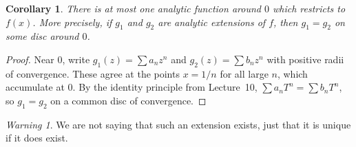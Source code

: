 \documentclass[11pt]{article}
\theoremstyle{plain}
\newtheorem{corollary}[theorem]{Corollary}
\theoremstyle{definition}
\theoremstyle{remark}
\newtheorem*{warning}{Warning}
\numberwithin{equation}{section}
\begin{document}
\begin{corollary}
\label{cor:unique-ext}
There is at most one analytic function around $0$ which restricts to
$f(x)$. More precisely, if $g_1$ and $g_2$ are analytic extensions of $f$,
then $g_1=g_2$ on some disc around $0$.
\end{corollary}

\begin{proof}
Near $0$, write $g_1(z)=\sum a_nz^n$ and $g_2(z)=\sum b_nz^n$ with positive
radii of convergence. These agree at the points $x=1/n$ for all large $n$,
which accumulate at $0$. By the identity principle from Lecture~10,
$\sum a_nT^n=\sum b_nT^n$, so $g_1=g_2$ on a common disc of convergence.
\end{proof}

\begin{warning}
We are not saying that such an extension exists, just that it is unique if
it does exist.
\end{warning}
\end{document}
